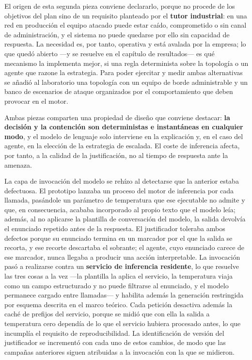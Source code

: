 El origen de esta segunda pieza conviene declararlo, porque no procede de los objetivos del plan
sino de un requisito planteado por el \textbf{tutor industrial}: en una red en producción el equipo
atacado puede estar caído, comprometido o sin canal de administración, y el sistema no puede quedarse
por ello sin capacidad de respuesta. La necesidad es, por tanto, operativa y está avalada por la
empresa; lo que quedó abierto ---y se resuelve en el capítulo de resultados--- es qué mecanismo la
implementa mejor, si una regla determinista sobre la topología o un agente que razone la estrategia.
Para poder ejercitar y medir ambas alternativas se añadió al laboratorio una topología con un equipo
de borde administrable y un banco de escenarios de ataque organizados por el comportamiento que deben
provocar en el motor.

Ambas piezas comparten una propiedad de diseño que conviene destacar: \textbf{la decisión y la
contención son deterministas e instantáneas en cualquier modo}, y el modelo de lenguaje solo
interviene en la explicación y, en el caso del agente, en la elección de la estrategia de escalada.
El coste de inferencia afecta, por tanto, a la calidad de la justificación, no al tiempo de
respuesta ante la amenaza.

La capa de invocación del modelo se rehízo al detectarse que la anterior estaba defectuosa. El
prototipo lanzaba un proceso del motor de inferencia por cada llamada, pasándole un parámetro de
temperatura que ese ejecutable no admite y que, en consecuencia, acababa incorporado al propio texto
que el modelo leía; además, al no aplicarse la plantilla de conversación del modelo, la salida
devolvía el enunciado repetido antes de la respuesta. El justificador toleraba ambos defectos porque
su enunciado termina en un marcador por el que la salida se recorta, y ese recorte descartaba el
sobrante; el agente, cuyo enunciado carece de ese marcador, nunca llegaba a producir una acción
interpretable. La invocación pasó a realizarse contra un \textbf{servicio de inferencia residente},
lo que resuelve las tres cosas a la vez ---la plantilla la aplica el servicio, la temperatura viaja
como un campo estructurado y no puede filtrarse al enunciado, y el modelo permanece cargado entre
llamadas--- y habilita además la generación restringida por esquema descrita en el marco teórico.
Cada petición desactiva además la caché de prefijos del servicio, porque se midió que con ella la
salida a temperatura cero dependía de lo que el servicio hubiera procesado antes, lo que
incumplía el requisito de reproducibilidad. La identificación de versión del justificador se
incrementó con cada uno de estos cambios, de modo que las campañas anteriores siguen atribuidas
a la invocación con la que se midieron.

